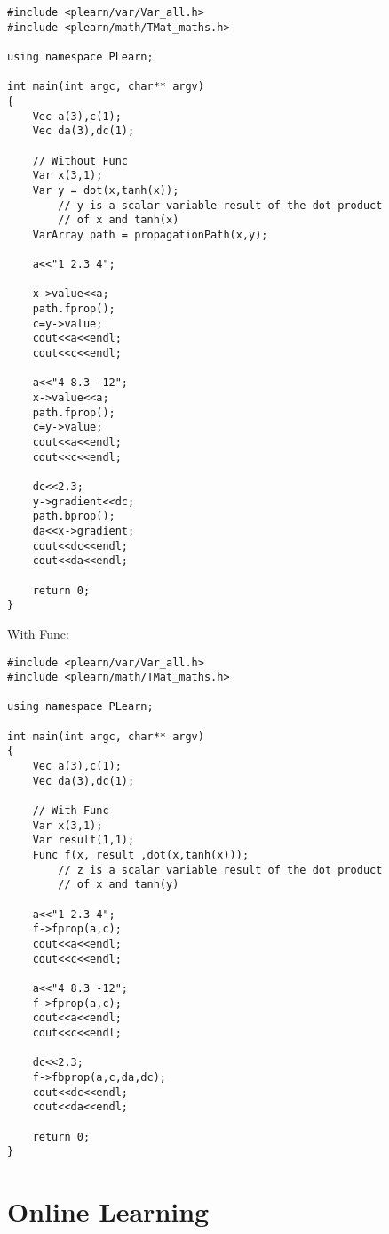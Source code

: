 \documentclass[11pt]{book}
\begin{document}
\begin{verbatim}
#include <plearn/var/Var_all.h>
#include <plearn/math/TMat_maths.h>

using namespace PLearn;

int main(int argc, char** argv)
{
    Vec a(3),c(1);
    Vec da(3),dc(1);

    // Without Func
    Var x(3,1);
    Var y = dot(x,tanh(x));
        // y is a scalar variable result of the dot product
        // of x and tanh(x)
    VarArray path = propagationPath(x,y);

    a<<"1 2.3 4";

    x->value<<a;
    path.fprop();
    c=y->value;
    cout<<a<<endl;
    cout<<c<<endl;

    a<<"4 8.3 -12";
    x->value<<a;
    path.fprop();
    c=y->value;
    cout<<a<<endl;
    cout<<c<<endl;

    dc<<2.3;
    y->gradient<<dc;
    path.bprop();
    da<<x->gradient;
    cout<<dc<<endl;
    cout<<da<<endl;

    return 0;
}
\end{verbatim}

With Func:

\begin{verbatim}
#include <plearn/var/Var_all.h>
#include <plearn/math/TMat_maths.h>

using namespace PLearn;

int main(int argc, char** argv)
{
    Vec a(3),c(1);
    Vec da(3),dc(1);

    // With Func
    Var x(3,1);
    Var result(1,1);
    Func f(x, result ,dot(x,tanh(x)));
        // z is a scalar variable result of the dot product
        // of x and tanh(y)

    a<<"1 2.3 4";
    f->fprop(a,c);
    cout<<a<<endl;
    cout<<c<<endl;

    a<<"4 8.3 -12";
    f->fprop(a,c);
    cout<<a<<endl;
    cout<<c<<endl;

    dc<<2.3;
    f->fbprop(a,c,da,dc);
    cout<<dc<<endl;
    cout<<da<<endl;

    return 0;
}
\end{verbatim}

\section{Online Learning}
\end{document}
